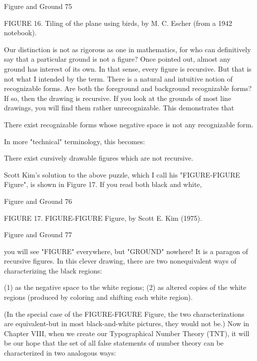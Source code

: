 Figure and Ground                                                                          75

FIGURE 16. Tiling of the plane using birds, by M. C. Escher (from a 1942 notebook).

        Our distinction is not as rigorous as one in mathematics, for who can definitively
say that a particular ground is not a figure? Once pointed out, almost any ground has
interest of its own. In that sense, every figure is recursive. But that is not what I intended
by the term. There is a natural and intuitive notion of recognizable forms. Are both the
foreground and background recognizable forms? If so, then the drawing is recursive. If
you look at the grounds of most line drawings, you will find them rather unrecognizable.
This demonstrates that

      There exist recognizable forms whose negative space is not any recognizable form.

In more "technical" terminology, this becomes:

       There exist cursively drawable figures which are not recursive.

       Scott Kim's solution to the above puzzle, which I call his "FIGURE-FIGURE
Figure", is shown in Figure 17. If you read both black and white,




Figure and Ground                                                                          76

              FIGURE 17. FIGURE-FIGURE Figure, by Scott E. Kim (1975).




Figure and Ground                                                        77

you will see "FIGURE" everywhere, but "GROUND" nowhere! It is a paragon of
recursive figures. In this clever drawing, there are two nonequivalent ways of
characterizing the black regions:

  (1) as the negative space to the white regions;
  (2) as altered copies of the white regions (produced by coloring and shifting each
        white region).

(In the special case of the FIGURE-FIGURE Figure, the two characterizations are
equivalent-but in most black-and-white pictures, they would not be.) Now in Chapter
VIII, when we create our Typographical Number Theory (TNT), it will be our hope that
the set of all false statements of number theory can be characterized in two analogous
ways:

